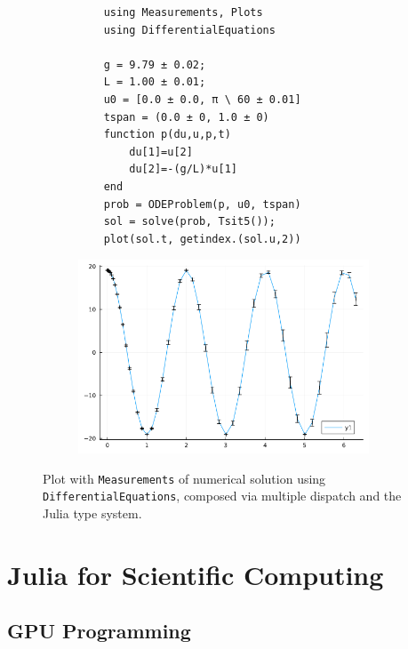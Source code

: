 \documentclass{webofc}
\begin{document}
\begin{figure}[!ht]
\begin{subfigure}[t!]{0.40\textwidth}
    
    \begin{verbatim}
    using Measurements, Plots
    using DifferentialEquations

    g = 9.79 ± 0.02; 
    L = 1.00 ± 0.01;
    u0 = [0.0 ± 0.0, π \ 60 ± 0.01]
    tspan = (0.0 ± 0, 1.0 ± 0) 
    function p(du,u,p,t)
        du[1]=u[2]
        du[2]=-(g/L)*u[1]
    end
    prob = ODEProblem(p, u0, tspan) 
    sol = solve(prob, Tsit5());
    plot(sol.t, getindex.(sol.u,2)) 
    \end{verbatim}
\end{subfigure}
\hfill
\begin{subfigure}[t!]{0.55\textwidth}
    \includegraphics[width=0.95\textwidth]{errorbars.png}
\end{subfigure}
    \caption{Plot with \texttt{Measurements} of numerical solution using \texttt{DifferentialEquations}, 
    composed via multiple dispatch and the Julia type system.}
    \label{code:plotmeasure}
    \end{figure}


\section{Julia for Scientific Computing}
\label{sec:juliascicomp}

    
\subsection{GPU Programming}
\label{sec:gpuprog}
\end{document}
